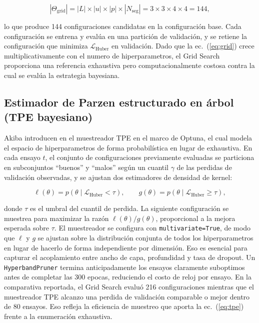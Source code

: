 \documentclass[12pt, letterpaper]{article}
\begin{document}
\begin{equation}
  |\Theta_{\text{grid}}| = |L| \times |u| \times |p| \times |N_{\text{seg}}| = 3 \times 3 \times 4 \times 4 = 144,
  \label{eq:grid}
\end{equation}

lo que produce 144 configuraciones candidatas en la configuración base. Cada configuración se entrena y evalúa en una partición de validación, y se retiene la configuración que minimiza $\mathcal{L}_{\text{Huber}}$ en validación. Dado que la ec.~(\ref{eq:grid}) crece multiplicativamente con el numero de hiperparametros, el Grid Search proporciona una referencia exhaustiva pero computacionalmente costosa contra la cual se evalúa la estrategia bayesiana.

\subsection{Estimador de Parzen estructurado en árbol (TPE bayesiano)}

Akiba introducen en \cite{optuna2019} el muestreador TPE en el marco de Optuna, el cual modela el espacio de hiperparametros de forma probabilística en lugar de exhaustiva. En cada ensayo $t$, el conjunto de configuraciones previamente evaluadas se particiona en subconjuntos ``buenos'' y ``malos'' según un cuantil $\gamma$ de las perdidas de validación observadas, y se ajustan dos estimadores de densidad de kernel:

\begin{equation}
  \ell(\theta) = p(\theta \mid \mathcal{L}_{\text{Huber}} < \tau), \qquad
  g(\theta) = p(\theta \mid \mathcal{L}_{\text{Huber}} \ge \tau),
  \label{eq:tpe}
\end{equation}

donde $\tau$ es el umbral del cuantil de perdida. La siguiente configuración se muestrea para maximizar la razón $\ell(\theta)/g(\theta)$, proporcional a la mejora esperada sobre $\tau$. El muestreador se configura con \texttt{multivariate=True}, de modo que $\ell$ y $g$ se ajustan sobre la distribución conjunta de todos los hiperparametros en lugar de hacerlo de forma independiente por dimensión. Eso es esencial para capturar el acoplamiento entre ancho de capa, profundidad y tasa de dropout. Un \texttt{HyperbandPruner} termina anticipadamente los ensayos claramente suboptimos antes de completar las 300 epocas, reduciendo el costo de reloj por ensayo. En la comparativa reportada, el Grid Search evaluó 216 configuraciones mientras que el muestreador TPE alcanzo una perdida de validación comparable o mejor dentro de 80 ensayos. Eso refleja la eficiencia de muestreo que aporta la ec.~(\ref{eq:tpe}) frente a la enumeración exhaustiva.
\end{document}
